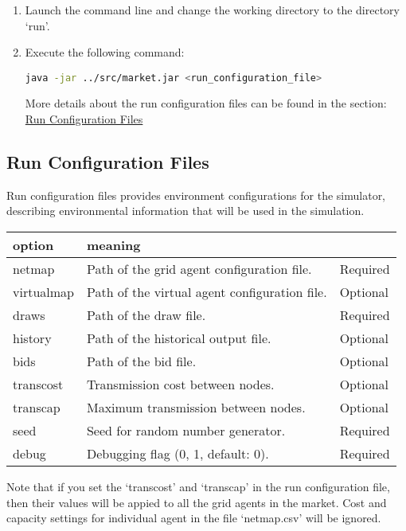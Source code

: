 \documentclass[12pt]{article}
\begin{document}
\begin{enumerate}
    \item{Launch the command line and change the working directory to the directory `run'.}
    \item{Execute the following command: }
        \begin{center}
            \lstinline[language=bash]!java -jar ../src/market.jar <run_configuration_file>!
        \end{center}
        More details about the run configuration files can be found in the section: 
        \hyperref[subsec:running_runconfig]{Run Configuration Files}
\end{enumerate}

\subsection{Run Configuration Files}
\label{subsec:running_runconfig}

Run configuration files provides environment configurations for the simulator, 
describing environmental information that will be used in the simulation. 

\bigskip
\noindent
\begin{tabular} {| l | l | l |}
    \hline
    \textbf{option} & \textbf{meaning} & \textbf{} \\ \hline
    netmap & Path of the grid agent configuration file. & Required \\ \hline
    virtualmap & Path of the virtual agent configuration file. & Optional \\ \hline
    draws & Path of the draw file. & Required \\ \hline
    history & Path of the historical output file. & Optional \\ \hline
    bids & Path of the bid file. & Optional \\ \hline
    transcost & Transmission cost between nodes. & Optional \\ \hline
    transcap & Maximum transmission between nodes. & Optional \\ \hline
    seed & Seed for random number generator. & Required \\ \hline
    debug & Debugging flag (0, 1, default: 0). & Required \\ \hline
\end{tabular}

\bigskip
\noindent
Note that if you set the `transcost' and `transcap' in the run configuration file, 
then their values will be appied to all the grid agents in the market. 
Cost and capacity settings for individual agent in the file `netmap.csv' will be ignored. 
\end{document}
